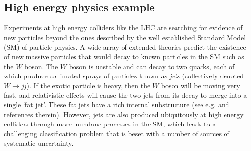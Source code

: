 \documentclass[twocolumn,superscriptaddress,aps]{revtex4-1}
\theoremstyle{plain}
\begin{document}
\subsection{High energy physics example}
\label{sec:hep}



Experiments at high energy colliders like the LHC \citep{LHCMachine}
are searching for evidence of new particles beyond the ones
described by the well established Standard Model (SM) of particle physics.
%
A wide array of extended theories predict the existence of new massive
particles that would decay to known particles in the SM such as the $W$ boson.
The $W$ boson is unstable and can decay to
two quarks, each of which produce collimated sprays of particles known as \textit{jets}
(collectively denoted $W\to jj$).
If the exotic particle is heavy, then the $W$ boson will be moving very fast,
and  relativistic effects will cause the two jets from its decay to merge into a single `fat jet'.
These fat jets have a rich internal substructure (see e.g.
\citep{Altheimer:2012mn,Altheimer:2013yza} and references therein).
However, jets are also produced ubiquitously at high energy colliders through
more mundane processes in the SM, which leads to a challenging classification problem
that is beset with a number of sources of systematic uncertainty.


\end{document}
